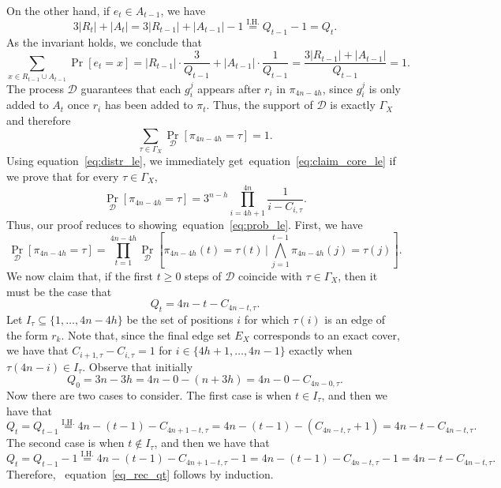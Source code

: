 \documentclass[11pt]{amsart}
\begin{document}
    On the other hand, if $e_t \in A_{t-1}$, we have
    \[
    3|R_t| + |A_t| = 3|R_{t-1}| + |A_{t-1}| - 1 \overset{\mathrm{I.H.}}{=} Q_{t-1} - 1 = Q_t.
    \]
    As the invariant holds, we conclude that
    \[
    \sum_{x \in R_{t-1} \cup A_{t-1}} \Pr[e_t = x] = |R_{t-1}| \cdot \frac{3}{Q_{t-1}} + |A_{t-1}| \cdot \frac{1}{Q_{t-1}} = \frac{3|R_{t-1}| + |A_{t-1}|}{Q_{t-1}} = 1.
    \]
    The process $\mathcal{D}$ guarantees that each $g_i^j$ appears after $r_i$ in $\pi_{4n-4h}$, since $g_i^j$ is only added to $A_{t}$ once $r_i$ has been added to $\pi_t$. Thus, the support of $\mathcal{D}$ is exactly $\Gamma_X$ and therefore
    \begin{equation}\label{eq:distr_le}
    \sum_{\tau \in \Gamma_X} \Pr_{\mathcal{D}}[\pi_{4n-4h} = \tau] = 1.
      \end{equation}
    Using equation~\eqref{eq:distr_le}, we immediately  get~equation~\eqref{eq:claim_core_le} if we  prove  that for every $\tau \in \Gamma_X$,
    \begin{equation}\label{eq:prob_le}
        \Pr_{\mathcal{D}}[\pi_{4n-4h} = \tau] = 3^{n-h} \prod_{i=4h+1}^{4n} \frac{1}{i-C_{i, \tau}}.
    \end{equation}
Thus, our proof reduces to showing~equation~\eqref{eq:prob_le}.
    First, we have
    \[
     \Pr_{\mathcal{D}}[\pi_{4n-4h} = \tau] =  \prod_{t=1}^{4n-4h} \Pr_{\mathcal{D}}\left[\pi_{4n-4h}(t) = \tau(t) \, \Big|\, \bigwedge_{j=1}^{t-1 }\pi_{4n-4h}(j) = \tau(j)\right].
    \]
We now claim that, if the first $t \geq 0$ steps of $\mathcal{D}$ coincide with $\tau \in \Gamma_X$, then it must be the case that
\begin{equation} \label{eq_rec_qt}
Q_{t} = 4n-t - C_{4n-t, \tau}.
\end{equation}
Let $I_\tau \subseteq \{1, \dots, 4n-4h\}$ be the set of positions $i$ for which $\tau(i)$ is an edge of the form $r_k$. Note that, since the final edge set $E_X$ corresponds to an exact cover, we have that $C_{i+1, \tau} - C_{i, \tau} = 1$ for $i \in \{4h+1, \dots, 4n-1\}$ exactly when $\tau(4n-i) \in I_\tau$.
Observe that initially \[Q_0 = 3n-3h = 4n - 0 - (n+3h) = 4n - 0 - C_{4n-0, \tau}.\] 
Now there are two cases to consider. The first case is when $t \in I_\tau$, and then we have that
$$Q_t = Q_{t-1} \overset{\mathrm{I.H.}}{=} 4n - (t-1) - C_{4n+1-t, \tau} = 4n - (t-1) - (C_{4n-t, \tau}+1) = 4n - t - C_{4n-t, \tau}.$$
The second case is when $t \notin I_\tau$, and then we have that
$$Q_t = Q_{t-1} -1 \overset{\mathrm{I.H.}}{=} 4n - (t-1) - C_{4n+1-t, \tau} - 1= 4n - (t-1) - C_{4n-t, \tau} - 1 = 4n - t - C_{4n-t, \tau}.$$
Therefore, ~equation~\eqref{eq_rec_qt} follows by induction. 
\end{document}
